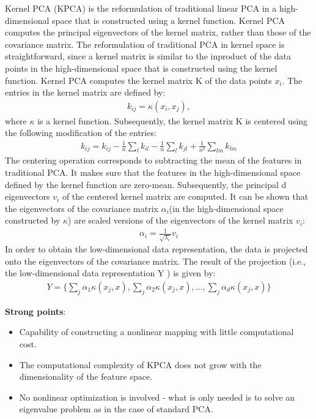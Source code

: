 \documentclass[a4paper]{article}
\begin{document}
Kernel PCA (KPCA) is the reformulation of traditional linear PCA in a
high-dimensional space that is constructed using a kernel
function. Kernel PCA computes the principal eigenvectors of the kernel
matrix, rather than those of the covariance matrix. The reformulation
of traditional PCA in kernel space is straightforward, since a kernel
matrix is similar to the inproduct of the data points in the high-dimensional space that is constructed using the kernel
function. Kernel PCA computes the kernel matrix K of the data points $x_i$. The entries in the kernel matrix are defined by:
\begin{align*}
    k_{ij}= \kappa(x_i, x_j),
\end{align*}
where $\kappa$ is a kernel function. Subsequently, the kernel matrix K
is centered using the following modification of the entries:
\begin{align*}
  k_{ij}= k_{ij}-\frac{1}{n}\sum_l k_{il}-\frac{1}{n}\sum_l k_{jl} + \frac{1}{n^2}\sum_{lm} k_{lm}
\end{align*}
The centering operation corresponds to subtracting the mean of the
features in traditional PCA. It makes sure that the features in the
high-dimensional space defined by the kernel function are
zero-mean. Subsequently, the principal d eigenvectors $v_i$ of the centered kernel matrix are computed. It can be shown that the eigenvectors of the covariance
matrix $\alpha_i$(in the high-dimensional space constructed by
$\kappa$) are scaled versions of the eigenvectors of the kernel matrix
$v_i$:
\begin{align*}
  \alpha_i = \frac{1}{\sqrt{\lambda_i}}v_i
\end{align*}
In order to obtain the low-dimensional data representation, the data
is projected onto the eigenvectors of the covariance matrix. The result of the projection (i.e., the low-dimensional data representation Y ) is given by:
\begin{align*}
  Y = \Big\{\sum_j\alpha_1\kappa(x_j,x),\sum_j\alpha_2\kappa(x_j,x),\ldots,\sum_j\alpha_d\kappa(x_j,x)\Big\}
\end{align*}

\textbf{Strong points}:
\begin{itemize}
  \item Capability of constructing a nonlinear mapping with little computational cost.
  \item The computational complexity of KPCA does not grow with the
    dimensionality of the feature space.
  \item No nonlinear optimization is involved - what is only needed is
    to solve an eigenvalue problem as in the case of standard PCA.
\end{itemize}
\end{document}
